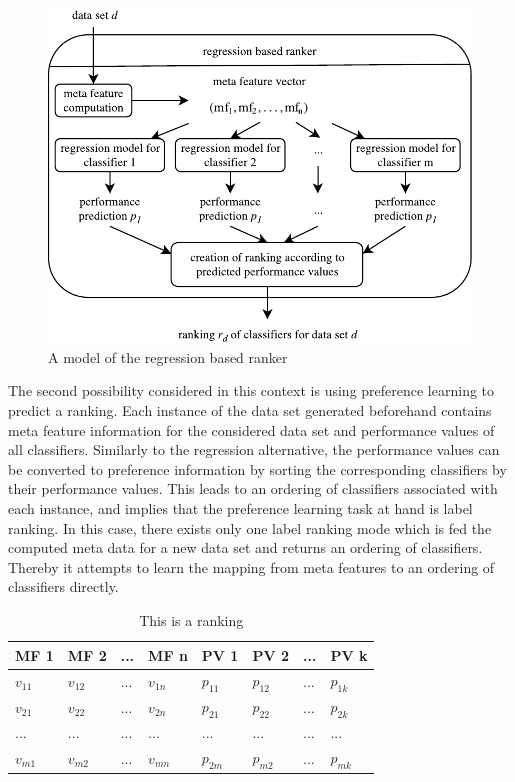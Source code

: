 \begin{figure}
\centering
\includegraphics[scale=1]{gfx/regression_models.pdf}
\caption{A model of the regression based ranker}
\label{fig:regression_ranker_model}
\end{figure}

The second possibility considered in this context is using preference learning to predict a ranking. Each instance of the data set generated beforehand contains meta feature information for the considered data set and performance values of all classifiers. Similarly to the regression alternative, the performance values can be converted to preference information by sorting the corresponding classifiers by their performance values. This leads to an ordering of classifiers associated with each instance, and implies that the preference learning task at hand is label ranking. In this case, there exists only one label ranking mode which is fed the computed meta data for a new data set and returns an ordering of classifiers. Thereby it attempts to learn the mapping from meta features to an ordering of classifiers directly.

\begin{table}[h]
\centering
	\begin{tabularx}{\textwidth}{X | X | X | X | X | X | X | X}
		MF 1				& MF 2				& ... 	& MF n				& PV 1 		& PV 2 		&	...	&	PV k 		\\ \hline
		$v_{11}$			& $v_{12}$			& ...	& $v_{1n}$			& $p_{11}$	& $p_{12}$	& 	...	&	$p_{1k}$		\\ \hline
		$v_{21}$			& $v_{22}$			& ...	& $v_{2n}$			& $p_{21}$	& $p_{22}$	& 	...	&	$p_{2k}$		\\ \hline
		...				& ...				& ...	& ...				& ...		& ...		&	...	&	...			\\ \hline
		$v_{m1}$			& $v_{m2}$			& ... 	& $v_{mn}$			& $p_{2m}$	& $p_{m2}$	& 	...	&	$p_{mk}$			 
	\end{tabularx}
	\label{tab:table1}
	\caption{This is a ranking}
\end{table}

